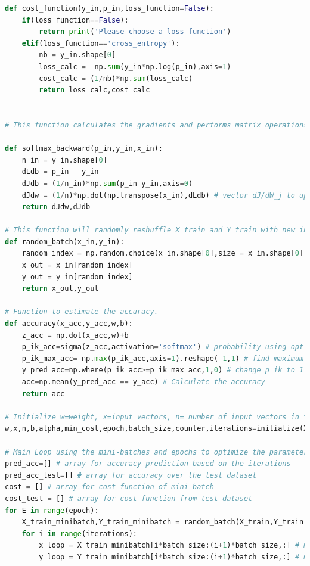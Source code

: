 \documentclass{article}
\begin{document}
\begin{lstlisting}[language=Python]
def cost_function(y_in,p_in,loss_function=False): 
    if(loss_function==False):
        return print('Please choose a loss function')
    elif(loss_function=='cross_entropy'):
        nb = y_in.shape[0]
        loss_calc = -np.sum(y_in*np.log(p_in),axis=1)
        cost_calc = (1/nb)*np.sum(loss_calc)
        return loss_calc,cost_calc
        
        
# This function calculates the gradients and performs matrix operations to estimate the partial derivatives. dLdb represents the derivative of the loss function with respect to the offset parameter b. dJdb = derivative of the cost function with respect to b and dJdw = derivative of the cost function with respect to a specific j-th weight. Numpy library was used for vectorization and to perform element-wise operations instead of for loops.  

def softmax_backward(p_in,y_in,x_in):
    n_in = y_in.shape[0]
    dLdb = p_in - y_in
    dJdb = (1/n_in)*np.sum(p_in-y_in,axis=0)
    dJdw = (1/n)*np.dot(np.transpose(x_in),dLdb) # vector dJ/dW_j to update w_j
    return dJdw,dJdb
    
# This function will randomly reshuffle X_train and Y_train with new indexes - mini-batches
def random_batch(x_in,y_in):
    random_index = np.random.choice(x_in.shape[0],size = x_in.shape[0], replace= False)
    x_out = x_in[random_index]
    y_out = y_in[random_index]
    return x_out,y_out

# Function to estimate the accuracy.
def accuracy(x_acc,y_acc,w,b):
    z_acc = np.dot(x_acc,w)+b
    p_ik_acc=sigma(z_acc,activation='softmax') # probability using optimized parameters
    p_ik_max_acc= np.max(p_ik_acc,axis=1).reshape(-1,1) # find maximum for each row and reshape to column
    y_pred_acc=np.where(p_ik_acc>=p_ik_max_acc,1,0) # change p_ik to 1 in case the element of the row is >= maximum for row.
    acc=np.mean(y_pred_acc == y_acc) # Calculate the accuracy
    return acc
    
# Initialize w=weight, x=input vectors, n= number of input vectors in the data set, alpha = learning rate, min_cost = control variable.
w,x,n,b,alpha,min_cost,epoch,batch_size,counter,iterations=initialize(X_train,Y_train)

# Main Loop using the mini-batches and epochs to optimize the parameter of the model
pred_acc=[] # array for accuracy prediction based on the iterations
pred_acc_test=[] # array for accuracy over the test dataset
cost = [] # array for cost function of mini-batch
cost_test = [] # array for cost function from test dataset
for E in range(epoch):
    X_train_minibatch,Y_train_minibatch = random_batch(X_train,Y_train) # reshuffle X_train and Y_train
    for i in range(iterations):
        x_loop = X_train_minibatch[i*batch_size:(i+1)*batch_size,:] # mini-batches
        y_loop = Y_train_minibatch[i*batch_size:(i+1)*batch_size,:] # mini-batches
        

\end{lstlisting}
\end{document}
